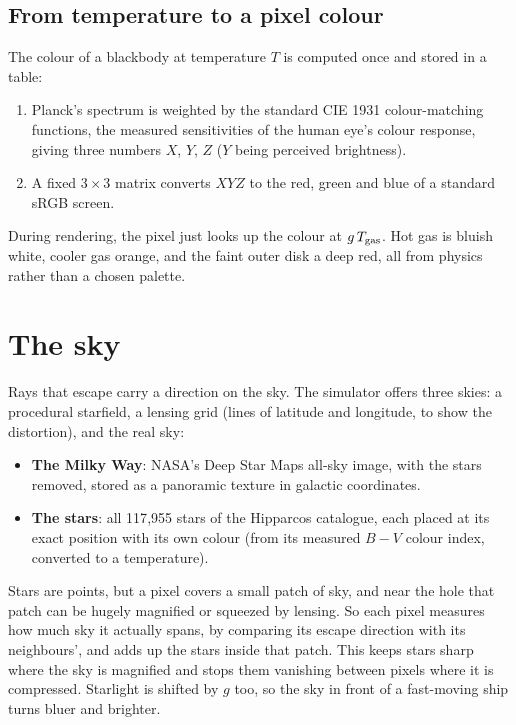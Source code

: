 \documentclass[11pt,a4paper]{article}
\begin{document}
\subsection{From temperature to a pixel colour}

The colour of a blackbody at temperature $T$ is computed once and stored in a table:
\begin{enumerate}
  \item Planck's spectrum is weighted by the standard CIE 1931 colour-matching functions,
        the measured sensitivities of the human eye's colour response, giving three
        numbers $X$, $Y$, $Z$ ($Y$ being perceived brightness).
  \item A fixed $3\times 3$ matrix converts $XYZ$ to the red, green and blue of a standard
        sRGB screen.
\end{enumerate}
During rendering, the pixel just looks up the colour at $g\,T_{\rm gas}$. Hot gas is
bluish white, cooler gas orange, and the faint outer disk a deep red, all from physics
rather than a chosen palette.

\section{The sky}\label{sec:sky}

Rays that escape carry a direction on the sky. The simulator offers three skies: a
procedural starfield, a lensing grid (lines of latitude and longitude, to show the
distortion), and the real sky:
\begin{itemize}
  \item \textbf{The Milky Way}: NASA's Deep Star Maps all-sky image, with the stars removed,
        stored as a panoramic texture in galactic coordinates.
  \item \textbf{The stars}: all 117{,}955 stars of the Hipparcos catalogue, each placed at
        its exact position with its own colour (from its measured $B-V$ colour index,
        converted to a temperature).
\end{itemize}
Stars are points, but a pixel covers a small patch of sky, and near the hole that patch can
be hugely magnified or squeezed by lensing. So each pixel measures how much sky it actually
spans, by comparing its escape direction with its neighbours', and adds up the stars
inside that patch. This keeps stars sharp where the sky is magnified and stops them
vanishing between pixels where it is compressed. Starlight is shifted by $g$ too, so the
sky in front of a fast-moving ship turns bluer and brighter.
\end{document}
